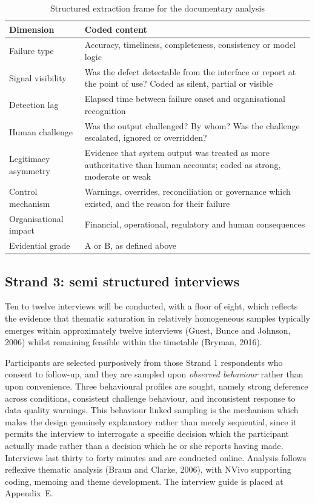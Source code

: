\documentclass[12pt,a4paper]{article}
\begin{document}
\begin{table}[H]
\centering\small
\caption{Structured extraction frame for the documentary analysis}
\label{tab:frame}
\begin{tabularx}{\textwidth}{@{}p{3.4cm} X@{}}
\toprule
\textbf{Dimension} & \textbf{Coded content} \\
\midrule
Failure type & Accuracy, timeliness, completeness, consistency or model logic \\
Signal visibility & Was the defect detectable from the interface or report at the point of use? Coded as
silent, partial or visible \\
Detection lag & Elapsed time between failure onset and organisational recognition \\
Human challenge & Was the output challenged? By whom? Was the challenge escalated, ignored or overridden? \\
Legitimacy asymmetry & Evidence that system output was treated as more authoritative than human accounts;
coded as strong, moderate or weak \\
Control mechanism & Warnings, overrides, reconciliation or governance which existed, and the reason for
their failure \\
Organisational impact & Financial, operational, regulatory and human consequences \\
Evidential grade & A or B, as defined above \\
\bottomrule
\end{tabularx}
\end{table}

\subsection{Strand 3: semi structured interviews}

Ten to twelve interviews will be conducted, with a floor of eight, which reflects the evidence that
thematic saturation in relatively homogeneous samples typically emerges within approximately twelve
interviews (Guest, Bunce and Johnson, 2006) whilst remaining feasible within the timetable (Bryman, 2016).

Participants are selected purposively from those Strand 1 respondents who consent to follow-up, and they
are sampled upon \emph{observed behaviour} rather than upon convenience. Three behavioural profiles are
sought, namely strong deference across conditions, consistent challenge behaviour, and inconsistent
response to data quality warnings. This behaviour linked sampling is the mechanism which makes the design
genuinely explanatory rather than merely sequential, since it permits the interview to interrogate a
specific decision which the participant actually made rather than a decision which he or she reports having
made. Interviews last thirty to forty minutes and are conducted online. Analysis follows reflexive thematic
analysis (Braun and Clarke, 2006), with NVivo supporting coding, memoing and theme development. The
interview guide is placed at Appendix~E.
\end{document}
